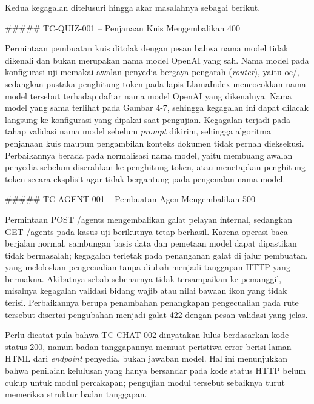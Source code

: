 \documentclass[12pt,a4paper]{article}
\begin{document}
Kedua kegagalan ditelusuri hingga akar masalahnya sebagai berikut.



\#\#\#\#\# TC-QUIZ-001 -- Penjanaan Kuis Mengembalikan 400



Permintaan pembuatan kuis ditolak dengan pesan bahwa nama model tidak dikenali dan bukan merupakan nama model OpenAI yang sah. Nama model pada konfigurasi uji memakai awalan penyedia bergaya pengarah (\textit{router}), yaitu oc/, sedangkan pustaka penghitung token pada lapis LlamaIndex mencocokkan nama model tersebut terhadap daftar nama model OpenAI yang dikenalnya. Nama model yang sama terlihat pada Gambar 4-7, sehingga kegagalan ini dapat dilacak langsung ke konfigurasi yang dipakai saat pengujian. Kegagalan terjadi pada tahap validasi nama model sebelum \textit{prompt} dikirim, sehingga algoritma penjanaan kuis maupun pengambilan konteks dokumen tidak pernah dieksekusi. Perbaikannya berada pada normalisasi nama model, yaitu membuang awalan penyedia sebelum diserahkan ke penghitung token, atau menetapkan penghitung token secara eksplisit agar tidak bergantung pada pengenalan nama model.



\#\#\#\#\# TC-AGENT-001 -- Pembuatan Agen Mengembalikan 500



Permintaan POST /agents mengembalikan galat pelayan internal, sedangkan GET /agents pada kasus uji berikutnya tetap berhasil. Karena operasi baca berjalan normal, sambungan basis data dan pemetaan model dapat dipastikan tidak bermasalah; kegagalan terletak pada penanganan galat di jalur pembuatan, yang meloloskan pengecualian tanpa diubah menjadi tanggapan HTTP yang bermakna. Akibatnya sebab sebenarnya tidak tersampaikan ke pemanggil, misalnya kegagalan validasi bidang wajib atau nilai bawaan ikon yang tidak terisi. Perbaikannya berupa penambahan penangkapan pengecualian pada rute tersebut disertai pengubahan menjadi galat 422 dengan pesan validasi yang jelas.



Perlu dicatat pula bahwa TC-CHAT-002 dinyatakan lulus berdasarkan kode status 200, namun badan tanggapannya memuat peristiwa error berisi laman HTML dari \textit{endpoint} penyedia, bukan jawaban model. Hal ini menunjukkan bahwa penilaian kelulusan yang hanya bersandar pada kode status HTTP belum cukup untuk modul percakapan; pengujian modul tersebut sebaiknya turut memeriksa struktur badan tanggapan.
\end{document}
